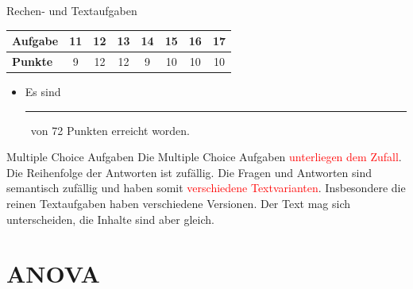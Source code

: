 \documentclass[a4paper, 9pt]{scrartcl}\usepackage[]{graphicx}\usepackage[]{xcolor}
\begin{document}
\begin{graybox}{Rechen- und Textaufgaben}
  \begin{center}
    \large
    \begin{tabular}{|l|c|c|c|c|c|c|c|}
      \hline
      \textbf{Aufgabe} & \textbf{11} & \textbf{12} & \textbf{13} & \textbf{14} & \textbf{15} & \textbf{16} & \textbf{17} \strut\\
      \hline
      \textbf{Punkte} & 
      \hspace{1Ex}\Large\textcolor{gray!70}{9}\hspace{1Ex}  & 
      \hspace{1Ex}\Large\textcolor{gray!70}{12}\hspace{1Ex}  & 
      \hspace{1Ex}\Large\textcolor{gray!70}{12}\hspace{1Ex}  & 
      \hspace{1Ex}\Large\textcolor{gray!70}{9}\hspace{1Ex}  & 
      \hspace{1Ex}\Large\textcolor{gray!70}{10}\hspace{1Ex}  & 
      \hspace{1Ex}\Large\textcolor{gray!70}{10}\hspace{1Ex}  & 
      \hspace{1Ex}\Large\textcolor{gray!70}{10}\hspace{1Ex} \strut\\
      \hline
  \end{tabular}
\end{center}
\begin{itemize}
\item Es sind \rule[0ex]{2em}{.4pt}\, von 72 Punkten erreicht worden.
\end{itemize}
\end{graybox}

\clearpage
\begin{graybox}{Multiple Choice Aufgaben}
Die Multiple Choice Aufgaben \textcolor{red}{unterliegen dem Zufall}. Die Reihenfolge der Antworten ist zufällig. Die Fragen und Antworten sind semantisch zufällig und haben somit \textcolor{red}{verschiedene Textvarianten}. Insbesondere die reinen Textaufgaben haben verschiedene Versionen. Der Text mag sich unterscheiden, die Inhalte sind aber gleich.
\end{graybox}
\section*{ANOVA}
\end{document}
